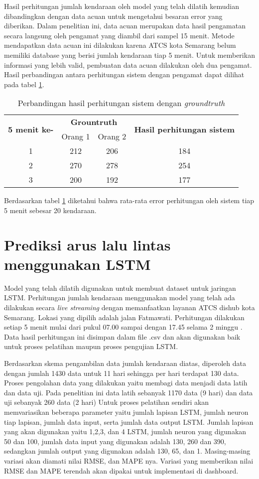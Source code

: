 \documentclass[../thesis.tex]{subfiles}
\begin{document}
Hasil perhitungan jumlah kendaraan oleh model yang telah dilatih kemudian dibandingkan dengan data acuan untuk mengetahui besaran error yang diberikan. Dalam penelitian ini, data acuan merupakan data hasil pengamatan secara langsung oleh pengamat yang diambil dari sampel 15 menit.
Metode mendapatkan data acuan ini dilakukan karena ATCS kota Semarang belum memiliki database yang berisi jumlah kendaraan tiap 5 menit. Untuk memberikan informasi yang lebih valid, pembuatan data acuan dilakukan oleh dua pengamat.
Hasil perbandingan antara perhitungan sistem dengan pengamat dapat dilihat pada tabel \ref{Count_result}. 
\begin{table}[htp]
\centering
\begin{tabular}{|c|c|c|c|}
	\hline 
	\multirow{2}{*}{\textbf{5 menit ke-}} & \multicolumn{2}{c|}{\textbf{Grountruth}} &  \multirow{2}{*}{\textbf{Hasil perhitungan sistem}}\\ \cline{2-3}
	& Orang 1& Orang 2 &\\
	\hline
	1& 212 & 206 & 184\\
	2 & 270 & 278 & 254\\
	3 & 200 & 192 & 177\\
	\hline
\end{tabular}
\caption{Perbandingan hasil perhitungan sistem dengan \textit{groundtruth}}
\label{Count_result}
\end{table} 
Berdasarkan tabel \ref{Count_result} diketahui bahwa rata-rata error perhitungan oleh sistem tiap 5 menit sebesar 20 kendaraan.

\section{Prediksi arus lalu lintas menggunakan LSTM}
Model yang telah dilatih digunakan untuk membuat dataset untuk jaringan LSTM.
Perhitungan jumlah kendaraan menggunakan model yang telah ada dilakukan secara \textit{live streaming} dengan memanfaatkan layanan ATCS dishub kota Semarang. Lokasi yang dipilih adalah jalan Fatmawati. Perhitungan dilakukan setiap 5 menit mulai dari pukul 07.00 sampai dengan 17.45 selama 2 minggu . 
Data hasil perhitungan ini disimpan dalam file .csv dan akan digunakan baik untuk proses pelatihan maupun proses pengujian LSTM.

Berdasarkan skema pengambilan data jumlah kendaraan diatas, diperoleh data dengan jumlah 1430 data untuk 11 hari sehingga per hari terdapat 130 data.
Proses pengolahan data yang dilakukan yaitu membagi data menjadi data latih dan data uji. Pada penelitian ini data latih sebanyak 1170 data (9 hari) dan data uji sebanyak 260 data (2 hari)
Untuk proses pelatihan sendiri akan memvariasikan beberapa parameter yaitu jumlah lapisan LSTM, jumlah neuron tiap lapisan, jumlah data input, serta jumlah data output LSTM. 
Jumlah lapisan yang akan digunakan yaitu 1,2,3, dan 4 LSTM, jumlah neuron yang digunakan 50 dan 100, jumlah data input yang digunakan adalah 130, 260 dan 390, sedangkan jumlah output yang digunakan adalah 130, 65, dan 1. Masing-masing 
variasi akan diamati nilai RMSE, dan MAPE nya. Variasi yang memberikan nilai RMSE dan MAPE terendah akan dipakai untuk implementasi di dashboard.
\end{document}
